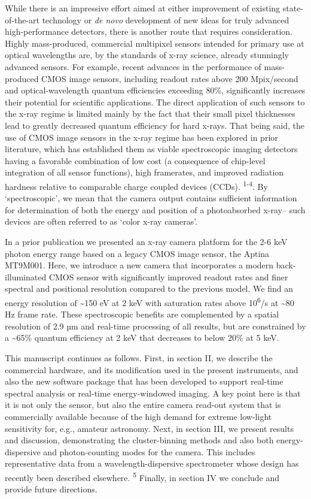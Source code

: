 While there is an impressive effort aimed at either improvement of
existing state-of-the-art technology or \emph{de novo} development of
new ideas for truly advanced high-performance detectors, there is
another route that requires consideration. Highly mass-produced,
commercial multipixel sensors intended for primary use at optical
wavelengths are, by the standards of x-ray science, already stunningly
advanced sensors. For example, recent advances in the performance of
mass-produced CMOS image sensors, including readout rates above 200
Mpix/second and optical-wavelength quantum efficiencies exceeding 80\%,
significantly increases their potential for scientific applications. The
direct application of such sensors to the x-ray regime is limited mainly
by the fact that their small pixel thicknesses lead to greatly decreased
quantum efficiency for hard x-rays. That being said, the use of CMOS
image sensors in the x-ray regime has been explored in prior literature,
which has established them as viable spectroscopic imaging detectors
having a favorable combination of low cost (a consequence of chip-level
integration of all sensor functions), high framerates, and improved
radiation hardness relative to comparable charge coupled devices (CCDs).
\textsuperscript{1-4}. By `spectroscopic', we mean that the camera
output contains sufficient information for determination of both the
energy and position of a photoabsorbed x-ray-- such devices are often
referred to as `color x-ray cameras'.

In a prior publication we presented an x-ray camera platform for the 2-6
keV photon energy range based on a legacy CMOS image sensor, the Aptina
MT9M001. Here, we introduce a new camera that incorporates a modern
back-illuminated CMOS sensor with significantly improved readout rates
and finer spectral and positional resolution compared to the previous
model. We find an energy resolution of \textasciitilde{}150 eV at 2 keV
with saturation rates above 10\textsuperscript{6}/s at
\textasciitilde{}80 Hz frame rate. These spectroscopic benefits are
complemented by a spatial resolution of 2.9 µm and real-time processing
of all results, but are constrained by a \textasciitilde{}65\% quantum
efficiency at 2 keV that decreases to below 20\% at 5 keV.

This manuscript continues as follows. First, in section II, we describe
the commercial hardware, and its modification used in the present
instruments, and also the new software package that has been developed
to support real-time spectral analysis or real-time energy-windowed
imaging. A key point here is that it is not only the sensor, but also
the entire camera read-out system that is commercially available because
of the high demand for extreme low-light sensitivity for, e.g., amateur
astronomy. Next, in section III, we present results and discussion,
demonstrating the cluster-binning methods and also both
energy-dispersive and photon-counting modes for the camera. This
includes representative data from a wavelength-dispersive spectrometer
whose design has recently been described elsewhere. \textsuperscript{5}
Finally, in section IV we conclude and provide future directions.

